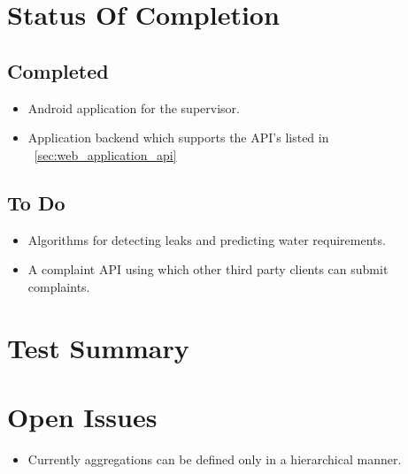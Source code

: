 \documentclass[11pt]{report} %
\begin{document}

\chapter{Status Of Completion}
\section{Completed}
\begin{itemize}
\item Android application for the supervisor.
\item Application backend which supports the API's listed in ~\ref{sec:web_application_api}
\end{itemize}
\section{To Do}
\begin{itemize}
\item Algorithms for detecting leaks and predicting water requirements.
\item A complaint API using which other third party clients can submit complaints.
\end{itemize}


\chapter{Test Summary}


\chapter{Open Issues}
\begin{itemize}
\item Currently aggregations can be defined only in a hierarchical manner.
\end{itemize}

\end{document}
